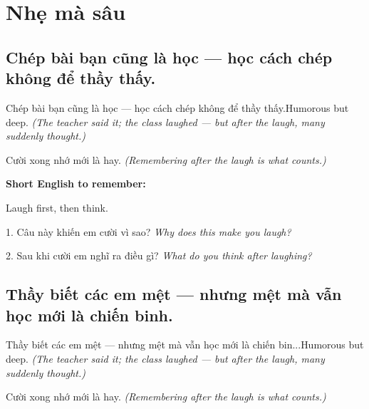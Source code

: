\chapter{Nhẹ mà sâu}


\section{Chép bài bạn cũng là học — học cách chép không để thầy thấy.}
\begin{truyen}{Chép bài bạn cũng là học — học cách chép không để thầy thấy.}{Humorous but deep.}
\textit{(The teacher said it; the class laughed — but after the laugh, many suddenly thought.)}
\end{truyen}

\begin{baihoc}
Cười xong nhớ mới là hay.
\textit{(Remembering after the laugh is what counts.)}
\end{baihoc}

\begin{ghinhoanh}
\textbf{Short English to remember:}

Laugh first, then think.

\end{ghinhoanh}

\begin{tuhocnhanh}
1. Câu này khiến em cười vì sao? \textit{Why does this make you laugh?}

2. Sau khi cười em nghĩ ra điều gì? \textit{What do you think after laughing?}
\end{tuhocnhanh}
\ngancach


\section{Thầy biết các em mệt — nhưng mệt mà vẫn học mới là chiến binh.}
\begin{truyen}{Thầy biết các em mệt — nhưng mệt mà vẫn học mới là chiến bin...}{Humorous but deep.}
\textit{(The teacher said it; the class laughed — but after the laugh, many suddenly thought.)}
\end{truyen}

\begin{baihoc}
Cười xong nhớ mới là hay.
\textit{(Remembering after the laugh is what counts.)}
\end{baihoc}

